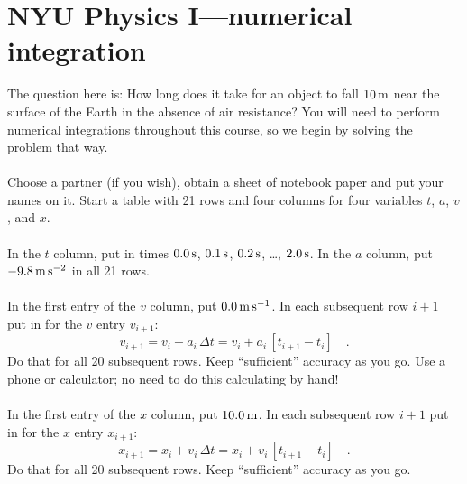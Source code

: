 \documentclass[12pt]{article}
\begin{document}
\section*{NYU Physics I---numerical integration}

The question here is: How long does it take for an object to fall
$10\,\mathrm{m}$ near the surface of the Earth in the absence of air
resistance?  You will need to perform numerical integrations
throughout this course, so we begin by solving the problem that way.

\paragraph{\theproblem}%
Choose a partner (if you wish), obtain a sheet of notebook paper and
put your names on it.  Start a table with 21 rows and four columns for
four variables $t$, $a$, $v$, and $x$.

\paragraph{\theproblem}%
In the $t$ column, put in times $0.0\,\mathrm{s}$, $0.1\,\mathrm{s}$, $0.2\,\mathrm{s}$,
\ldots, $2.0\,\mathrm{s}$.  In the $a$ column, put $-9.8\,\mathrm{m}\,\mathrm{s}^{-2}$ in all 21
rows.

\paragraph{\theproblem}%
In the first entry of the $v$ column, put $0.0\,\mathrm{m}\,\mathrm{s}^{-1}$.  In each
subsequent row $i+1$ put in for the $v$ entry $v_{i+1}$:
\begin{equation}
v_{i+1}= v_i + a_i\,\Delta t = v_i + a_i\,\left[t_{i+1}-t_i\right] \quad .
\end{equation}
Do that for all 20 subsequent rows.  Keep ``sufficient'' accuracy as
you go. Use a phone or calculator; no need to do this calculating by hand!

\paragraph{\theproblem}%
In the first entry of the $x$ column, put $10.0\,\mathrm{m}$.  In each
subsequent row $i+1$ put in for the $x$ entry $x_{i+1}$:
\begin{equation}
x_{i+1}= x_i + v_i\,\Delta t = x_i + v_i\,\left[t_{i+1}-t_i\right] \quad .
\end{equation}
Do that for all 20 subsequent rows.  Keep ``sufficient'' accuracy as
you go.
\end{document}
